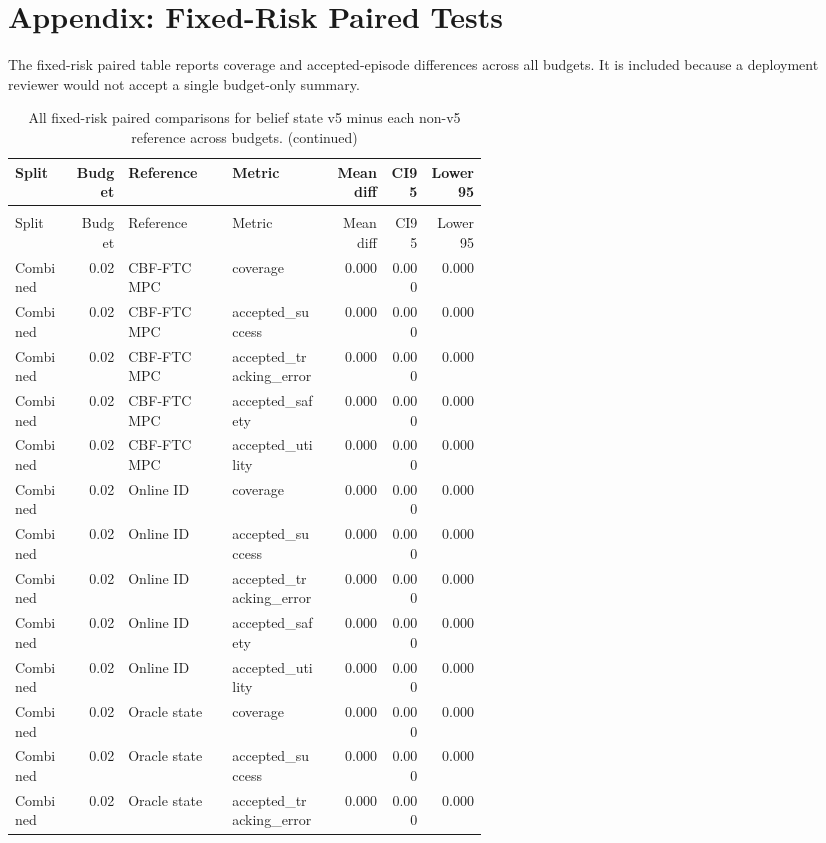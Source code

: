 \documentclass{article}
\begin{document}
\section{Appendix: Fixed-Risk Paired Tests}
The fixed-risk paired table reports coverage and accepted-episode differences across all budgets. It is included because a deployment reviewer would not accept a single budget-only summary.
\begin{center}
\tiny
\begin{longtable}{p{0.13\linewidth}rp{0.22\linewidth}p{0.20\linewidth}rrr}
\caption{All fixed-risk paired comparisons for belief state v5 minus each non-v5 reference across budgets.}\label{tab:fixed-pairwise}\\
\toprule
Split & Budget & Reference & Metric & Mean diff & CI95 & Lower95\\
\midrule
\endfirsthead
\caption[]{All fixed-risk paired comparisons for belief state v5 minus each non-v5 reference across budgets. (continued)}\\
\toprule
Split & Budget & Reference & Metric & Mean diff & CI95 & Lower95\\
\midrule
\endhead
Combined & 0.02 & CBF-FTC MPC & coverage & 0.000 & 0.000 & 0.000\\
Combined & 0.02 & CBF-FTC MPC & accepted\_success & 0.000 & 0.000 & 0.000\\
Combined & 0.02 & CBF-FTC MPC & accepted\_tracking\_error & 0.000 & 0.000 & 0.000\\
Combined & 0.02 & CBF-FTC MPC & accepted\_safety & 0.000 & 0.000 & 0.000\\
Combined & 0.02 & CBF-FTC MPC & accepted\_utility & 0.000 & 0.000 & 0.000\\
Combined & 0.02 & Online ID & coverage & 0.000 & 0.000 & 0.000\\
Combined & 0.02 & Online ID & accepted\_success & 0.000 & 0.000 & 0.000\\
Combined & 0.02 & Online ID & accepted\_tracking\_error & 0.000 & 0.000 & 0.000\\
Combined & 0.02 & Online ID & accepted\_safety & 0.000 & 0.000 & 0.000\\
Combined & 0.02 & Online ID & accepted\_utility & 0.000 & 0.000 & 0.000\\
Combined & 0.02 & Oracle state & coverage & 0.000 & 0.000 & 0.000\\
Combined & 0.02 & Oracle state & accepted\_success & 0.000 & 0.000 & 0.000\\
Combined & 0.02 & Oracle state & accepted\_tracking\_error & 0.000 & 0.000 & 0.000\\

\end{longtable}
\end{center}
\end{document}
